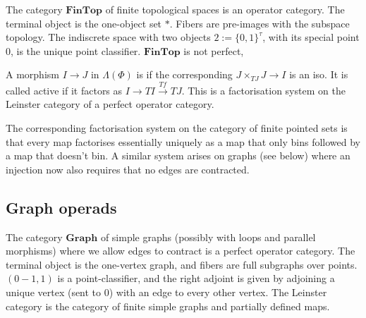 \begin{example}
    The category $\mathbf{FinTop}$ of finite topological spaces is an operator category. The terminal object is the one-object set $*$. Fibers are pre-images with the subspace topology. The indiscrete space with two objects $2:=\{0,1\}^\tau$, with its special point $0$, is the unique point classifier. $\mathbf{FinTop}$ is not perfect, 
\end{example}

\begin{definition}
    A morphism $I\rightarrow J$ in $\Lambda (\Phi)$ is  if the corresponding $J\times_{TJ}J\rightarrow I$ is an iso. It is called active if it factors as $I\rightarrow TI \xrightarrow{Tf} TJ$. This is a factorisation system on the Leinster category of a perfect operator category.
\end{definition}

\begin{example}
    The corresponding factorisation system on the category of finite pointed sets is that every map factorises essentially uniquely as a map that only bins followed by a map that doesn't bin. A similar system arises on graphs (see below) where an injection now also requires that no edges are contracted.
\end{example}

\subsection{Graph operads} The category $\mathbf{Graph}$ of simple graphs (possibly with loops and parallel morphisms) where we allow edges to contract is a perfect operator category. The terminal object is the one-vertex graph, and fibers are full subgraphs over points. $(0-1,1)$ is a point-classifier, and the right adjoint is given by adjoining a unique vertex (sent to $0$) with an edge to every other vertex. 
The Leinster category is the category of finite simple graphs and partially defined maps.

